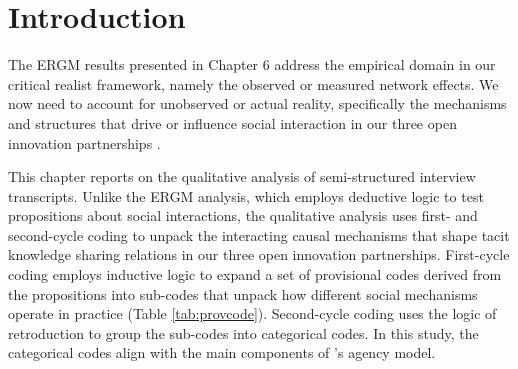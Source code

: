 \section{Introduction}

The ERGM results presented in Chapter 6 address the empirical domain in our critical realist framework, namely the observed or measured network effects. We now need to account for unobserved or actual reality, specifically the mechanisms and structures that drive or influence social interaction in our three open innovation partnerships \citep{welch2011theorising, mcavoy2018critical, haigh2019developing}. \medskip 

This chapter reports on the qualitative analysis of semi-structured interview transcripts. Unlike the ERGM analysis, which employs deductive logic to test propositions about social interactions, the qualitative analysis uses first- and second-cycle coding to unpack the interacting causal mechanisms that shape tacit knowledge sharing relations in our three open innovation partnerships. First-cycle coding employs inductive logic to expand a set of provisional codes derived from the propositions into sub-codes that unpack how different social mechanisms operate in practice (Table \ref{tab:provcode}). Second-cycle coding uses the logic of retroduction to group the sub-codes into categorical codes. In this study, the categorical codes align with the main components of \citeauthor{loyal2001agency}'s \citeyearpar{loyal2001agency} agency model. \medskip


